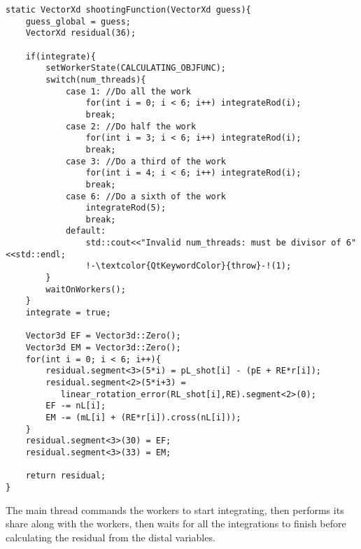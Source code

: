 \documentclass[12pt]{article}
\begin{document}
\begin{lstlisting}
static VectorXd shootingFunction(VectorXd guess){
    guess_global = guess;
    VectorXd residual(36);

    if(integrate){
        setWorkerState(CALCULATING_OBJFUNC);
        switch(num_threads){
            case 1: //Do all the work
                for(int i = 0; i < 6; i++) integrateRod(i);
                break;
            case 2: //Do half the work
                for(int i = 3; i < 6; i++) integrateRod(i);
                break;
            case 3: //Do a third of the work
                for(int i = 4; i < 6; i++) integrateRod(i);
                break;
            case 6: //Do a sixth of the work
                integrateRod(5);
                break;
            default:
                std::cout<<"Invalid num_threads: must be divisor of 6"<<std::endl;
                !-\textcolor{QtKeywordColor}{throw}-!(1);
        }
        waitOnWorkers();
    }
    integrate = true;

    Vector3d EF = Vector3d::Zero();
    Vector3d EM = Vector3d::Zero();
    for(int i = 0; i < 6; i++){
        residual.segment<3>(5*i) = pL_shot[i] - (pE + RE*r[i]);
        residual.segment<2>(5*i+3) =
           linear_rotation_error(RL_shot[i],RE).segment<2>(0);
        EF -= nL[i];
        EM -= (mL[i] + (RE*r[i]).cross(nL[i]));
    }
    residual.segment<3>(30) = EF;
    residual.segment<3>(33) = EM;

    return residual;
}
\end{lstlisting}
The main thread commands the workers to start integrating, then performs its share along with the workers, then waits for all the integrations to finish before calculating the residual from the distal variables.
\end{document}
